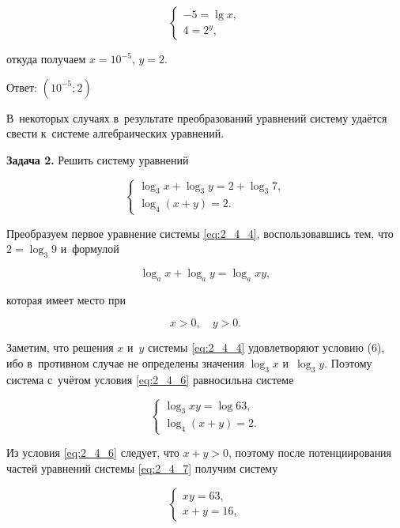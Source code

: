 \begin{equation*}
\begin{cases}
-5 = \lg x, \\
4 = 2^{y},
\end{cases}
\end{equation*}

\noindent
откуда получаем $x = 10^{-5}$, $y = 2$.

Ответ: $\left( 10^{-5}; 2\right)$

В~некоторых случаях в~результате преобразований уравнений систему удаётся свести
к~системе алгебраических уравнений.

\textbf{Задача 2.}\label{ex:2_4_2} Решить систему уравнений

\begin{equation}\label{eq:2_4_4}
\begin{cases}
\log_{3} x + \log_{3} y = 2 + \log_{3} 7, \\
\log_{4} (x + y) = 2.
\end{cases}
\end{equation}

Преобразуем первое уравнение системы \eqref{eq:2_4_4}, воспользовавшись тем,
что $2 = \log_{3} 9$ и~формулой

\begin{equation}\label{eq:2_4_5}
\log_{a} x + \log_{a} y = \log_{a} xy,
\end{equation}

\noindent
которая имеет место при

\begin{equation}\label{eq:2_4_6}
x > 0, \quad y > 0.
\end{equation}

\noindent
Заметим, что решения $x$ и~$y$ системы \eqref{eq:2_4_4} удовлетворяют
условию (6), ибо в~противном случае не определены значения $\log_{3} x$ и~$\log_{3} y$.
Поэтому система с~учётом условия \eqref{eq:2_4_6} равносильна системе

\begin{equation}\label{eq:2_4_7}
\begin{cases}
\log_{3} xy = \log 63, \\
\log_{4} (x + y) = 2.
\end{cases}
\end{equation}

Из условия \eqref{eq:2_4_6} следует, что $x + y > 0$, поэтому после
потенциирования частей уравнений системы \eqref{eq:2_4_7} получим систему

\begin{equation}\label{eq:2_4_8}
\begin{cases}
xy = 63, \\
x + y = 16,
\end{cases}
\end{equation}


